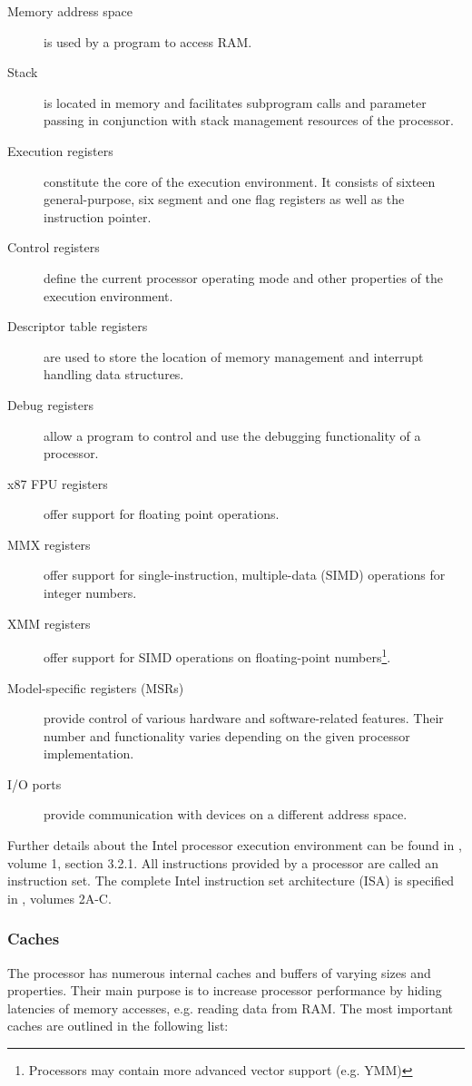 \begin{description}
	\item[Memory address space] is used by a program to access RAM.
	\item[Stack] is located in memory and facilitates subprogram calls and
		parameter passing in conjunction with stack management resources of the
		processor.
	\item[Execution registers] constitute the core of the execution environment.
		It consists of sixteen general-purpose, six segment and one flag
		registers as well as the instruction pointer.
	\item[Control registers] define the current processor operating mode and
		other properties of the execution environment.
	\item[Descriptor table registers] are used to store the location of memory
		management and interrupt handling data structures.
	\item[Debug registers] allow a program to control and use the debugging
		functionality of a processor.
	\item[x87 FPU registers] offer support for floating point operations.
	\item[MMX registers] offer support for single-instruction, multiple-data
		(SIMD) operations for integer numbers.
	\item[XMM registers] offer support for SIMD operations on floating-point
		numbers\footnote{Processors may contain more advanced vector support
		(e.g. YMM)}.
	\item[Model-specific registers (MSRs)] provide control of various hardware
		and software-related features. Their number and functionality varies
		depending on the given processor implementation.
	\item[I/O ports] provide communication with devices on a different address
		space.
\end{description}

Further details about the Intel processor execution environment can be found in
\cite{IntelSDM}, volume 1, section 3.2.1. All instructions provided by a
processor are called an instruction set. The complete Intel instruction set
architecture (ISA) is specified in \cite{IntelSDM}, volumes 2A-C.

\subsubsection{Caches}
The processor has numerous internal caches and buffers of varying
sizes and properties. Their main purpose is to increase processor performance
by hiding latencies of memory accesses, e.g. reading data from RAM. The most
important caches are outlined in the following list:

